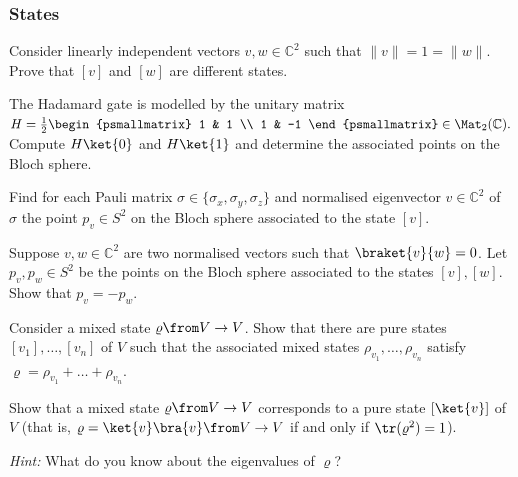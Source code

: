 \documentclass[a4paper,oneside, 12pt]{amsart}
\begin{document}
\subsubsection*{States}

\begin{exercise}
  Consider linearly independent vectors \(v, w \in \mathbb{C}^{2}\) such that \( \|v \| = 1 = \|w\|\).
  Prove that \([v]\) and \([w]\) are different states.
\end{exercise}


\begin{exercise}
  The Hadamard gate is modelled by the unitary matrix \(H= \tfrac{1}{2}
  \begin{psmallmatrix}
    1 & 1 \\ 1 & -1
  \end{psmallmatrix} \in \Mat_{2}( \mathbb{C}).
  \)
  Compute \(H\ket{0}\) and \(H \ket{1}\) and determine the associated points on the Bloch sphere.
\end{exercise}

\begin{exercise}
  Find for each Pauli matrix \(\sigma \in\{\sigma_{x}, \sigma_{y}, \sigma_{z}\}\) and normalised eigenvector \(v \in \mathbb{C}^{2}\) of \(\sigma\) the point \(p_{v}\in S^{2}\) on the Bloch sphere associated to the state \([v]\).
\end{exercise}

\begin{exercise}
  Suppose \(v, w \in \mathbb{C}^{2}\) are two normalised vectors such that \(\braket{v}{w}= 0\).
  Let \(p_{v}, p_{w} \in S^{2} \) be the points on the Bloch sphere associated to the states \([v], [w]\).
  Show that \(p_{v} = - p_{w}\).
\end{exercise}

\begin{exercise}
  Consider a mixed state \(\varrho \from V\to V\).
  Show that there are pure states \([v_{1}], \dots , [v_{n}]\) of \(V\) such that the associated mixed states \(\rho_{v_{1}}, \dots , \rho_{v_{n}}\) satisfy \(\varrho = \rho_{v_{1}}+ \dots + \rho_{v_{n}}\).
\end{exercise}

\begin{exercise}
  Show that a mixed state \(\varrho \from V\to V\) corresponds to a  pure state \([\ket{v}]\) of \(V\) (that is, \(\varrho = \ket{v}\bra{v} \from V \to V \) if and only if \(\tr(\varrho^{2}) = 1\)).

  \textit{Hint:} What do you know about the eigenvalues of \(\varrho\)?
\end{exercise}
\end{document}
